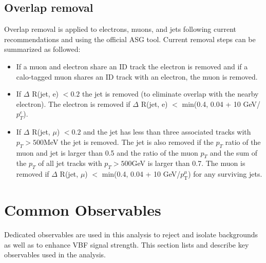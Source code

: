 \subsection{Overlap removal}
Overlap removal is applied to electrons, muons, and jets following current recommendations and using the official ASG tool. Current removal steps can be summarized as followed:
\begin{itemize}
\item If a muon and electron share an ID track the electron is removed and if a calo-tagged muon shares an ID track with an electron, the muon is removed.
\item If $\Delta$ R(jet, e) $< 0.2$ the jet is removed (to eliminate overlap with the nearby electron). The electron is removed if $\Delta$ R(jet, e) $<$ min(0.4, 0.04 + 10 GeV/$p_T^e$).
\item If $\Delta$ R(jet, $\mu$) $< 0.2$ and the jet has less than three associated tracks with $p_T>500$MeV the jet is removed. The jet is also removed if the $p_T$ ratio of the muon and jet is larger than 0.5 and the ratio of the muon $p_T$ and the sum of the $p_T$ of all jet tracks with $p_T>500$GeV is larger than 0.7. The muon is removed if $\Delta$ R(jet, $\mu$) $<$ min(0.4, 0.04 + 10 GeV/$p_\mathrm{{T}}^{\mu}$) for any surviving jets.
\end{itemize}


\section{Common Observables}

Dedicated observables are used in this analysis to reject and isolate backgrounds as well as to enhance VBF signal strength. This section lists and describe key observables used in the analysis.

